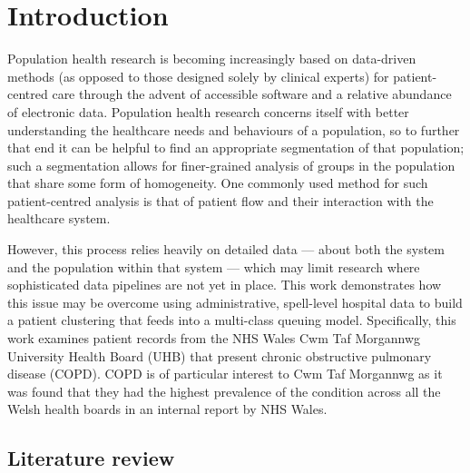\section{Introduction}\label{sec:intro}

Population health research is becoming increasingly based on data-driven methods
(as opposed to those designed solely by clinical experts) for patient-centred
care through the advent of accessible software and a relative abundance of
electronic data. Population health research concerns itself with better
understanding the healthcare needs and behaviours of a population, so to further
that end it can be helpful to find an appropriate segmentation of that
population; such a segmentation allows for finer-grained analysis of groups in
the population that share some form of homogeneity. One commonly used method for
such patient-centred analysis is that of patient flow and their interaction with
the healthcare system.

However, this process relies heavily on detailed data --- about both the system
and the population within that system --- which may limit research where
sophisticated data pipelines are not yet in place. This work demonstrates how
this issue may be overcome using administrative, spell-level hospital data to
build a patient clustering that feeds into a multi-class queuing model.
Specifically, this work examines patient records from the NHS Wales Cwm Taf
Morgannwg University Health Board (UHB) that present chronic obstructive
pulmonary disease (COPD). COPD is of particular interest to Cwm Taf Morgannwg as
it was found that they had the highest prevalence of the condition across all
the Welsh health boards in an internal report by NHS Wales.



\subsection{Literature review}\label{subsec:review}

